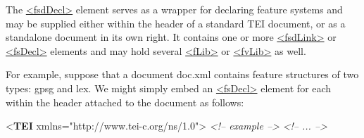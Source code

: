  The \hyperref[TEI.fsdDecl]{<fsdDecl>} element serves as a wrapper for declaring feature systems and may be supplied either within the header of a standard TEI document, or as a standalone document in its own right. It contains one or more \hyperref[TEI.fsdLink]{<fsdLink>} or \hyperref[TEI.fsDecl]{<fsDecl>} elements and may hold several \hyperref[TEI.fLib]{<fLib>} or \hyperref[TEI.fvLib]{<fvLib>} as well.\par
For example, suppose that a document \textsf{doc.xml} contains feature structures of two types: gpsg and lex. We might simply embed an \hyperref[TEI.fsDecl]{<fsDecl>} element for each within the header attached to the document as follows: \par\bgroup{}\exampleFont \begin{shaded}\noindent\mbox{}{<\textbf{TEI} xmlns="http://www.tei-c.org/ns/1.0">}\mbox{}\newline 
{}\mbox{}\newline 
\hspace*{1em}\mbox{}\newline 
\textit{<!-- example -->}\mbox{}\newline 
\hspace*{1em}\mbox{}\newline 
\hspace*{1em}\mbox{}\newline 
\textit{<!-- ... -->}\mbox{}\newline 
\hspace*{1em}\hspace*{1em}\mbox{}\newline 
\hspace*{1em}\hspace*{1em}\hspace*{1em}\mbox{}\newline 

\end{shaded}
